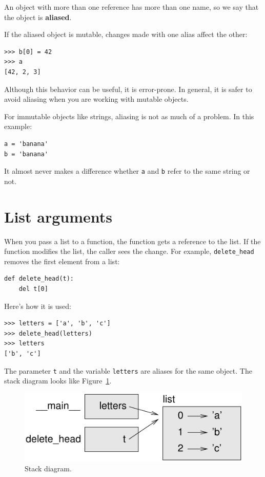 \documentclass[10pt]{book}
\begin{document}
An object with more than one reference has more
than one name, so we say that the object is {\bf aliased}.

If the aliased object is mutable, changes made with one alias affect
the other:

\begin{verbatim}
>>> b[0] = 42
>>> a
[42, 2, 3]
\end{verbatim}
%
Although this behavior can be useful, it is error-prone.  In general,
it is safer to avoid aliasing when you are working with mutable
objects.

For immutable objects like strings, aliasing is not as much of a
problem.  In this example:

\begin{verbatim}
a = 'banana'
b = 'banana'
\end{verbatim}
%
It almost never makes a difference whether {\tt a} and {\tt b} refer
to the same string or not.


\section{List arguments}
\label{list.arguments}

When you pass a list to a function, the function gets a reference to
the list.  If the function modifies the list, the caller sees
the change.  For example, \verb"delete_head" removes the first element
from a list:

\begin{verbatim}
def delete_head(t):
    del t[0]
\end{verbatim}
%
Here's how it is used:

\begin{verbatim}
>>> letters = ['a', 'b', 'c']
>>> delete_head(letters)
>>> letters
['b', 'c']
\end{verbatim}
%
The parameter {\tt t} and the variable {\tt letters} are
aliases for the same object.  The stack diagram looks like
Figure~\ref{fig.stack5}.

\begin{figure}
\centerline
{\includegraphics[scale=0.8]{figs/stack5.pdf}}
\caption{Stack diagram.}
\label{fig.stack5}
\end{figure}
\end{document}
